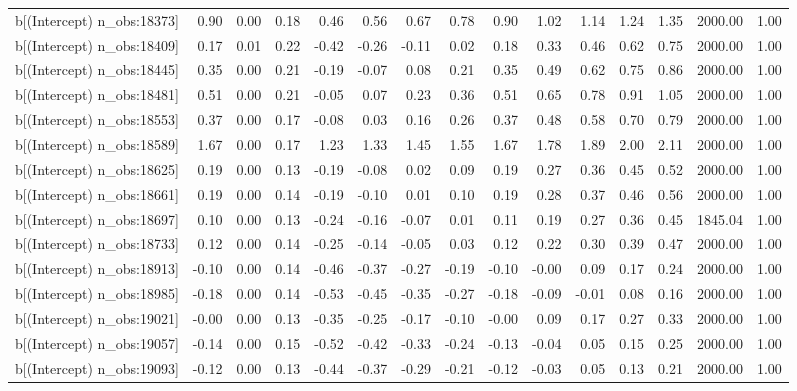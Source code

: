 \begin{table}[ht]
\begin{tabular}{rrrrrrrrrrrrrrr}
  b[(Intercept) n\_obs:18373] & 0.90 & 0.00 & 0.18 & 0.46 & 0.56 & 0.67 & 0.78 & 0.90 & 1.02 & 1.14 & 1.24 & 1.35 & 2000.00 & 1.00 \\ 
  b[(Intercept) n\_obs:18409] & 0.17 & 0.01 & 0.22 & -0.42 & -0.26 & -0.11 & 0.02 & 0.18 & 0.33 & 0.46 & 0.62 & 0.75 & 2000.00 & 1.00 \\ 
  b[(Intercept) n\_obs:18445] & 0.35 & 0.00 & 0.21 & -0.19 & -0.07 & 0.08 & 0.21 & 0.35 & 0.49 & 0.62 & 0.75 & 0.86 & 2000.00 & 1.00 \\ 
  b[(Intercept) n\_obs:18481] & 0.51 & 0.00 & 0.21 & -0.05 & 0.07 & 0.23 & 0.36 & 0.51 & 0.65 & 0.78 & 0.91 & 1.05 & 2000.00 & 1.00 \\ 
  b[(Intercept) n\_obs:18553] & 0.37 & 0.00 & 0.17 & -0.08 & 0.03 & 0.16 & 0.26 & 0.37 & 0.48 & 0.58 & 0.70 & 0.79 & 2000.00 & 1.00 \\ 
  b[(Intercept) n\_obs:18589] & 1.67 & 0.00 & 0.17 & 1.23 & 1.33 & 1.45 & 1.55 & 1.67 & 1.78 & 1.89 & 2.00 & 2.11 & 2000.00 & 1.00 \\ 
  b[(Intercept) n\_obs:18625] & 0.19 & 0.00 & 0.13 & -0.19 & -0.08 & 0.02 & 0.09 & 0.19 & 0.27 & 0.36 & 0.45 & 0.52 & 2000.00 & 1.00 \\ 
  b[(Intercept) n\_obs:18661] & 0.19 & 0.00 & 0.14 & -0.19 & -0.10 & 0.01 & 0.10 & 0.19 & 0.28 & 0.37 & 0.46 & 0.56 & 2000.00 & 1.00 \\ 
  b[(Intercept) n\_obs:18697] & 0.10 & 0.00 & 0.13 & -0.24 & -0.16 & -0.07 & 0.01 & 0.11 & 0.19 & 0.27 & 0.36 & 0.45 & 1845.04 & 1.00 \\ 
  b[(Intercept) n\_obs:18733] & 0.12 & 0.00 & 0.14 & -0.25 & -0.14 & -0.05 & 0.03 & 0.12 & 0.22 & 0.30 & 0.39 & 0.47 & 2000.00 & 1.00 \\ 
  b[(Intercept) n\_obs:18913] & -0.10 & 0.00 & 0.14 & -0.46 & -0.37 & -0.27 & -0.19 & -0.10 & -0.00 & 0.09 & 0.17 & 0.24 & 2000.00 & 1.00 \\ 
  b[(Intercept) n\_obs:18985] & -0.18 & 0.00 & 0.14 & -0.53 & -0.45 & -0.35 & -0.27 & -0.18 & -0.09 & -0.01 & 0.08 & 0.16 & 2000.00 & 1.00 \\ 
  b[(Intercept) n\_obs:19021] & -0.00 & 0.00 & 0.13 & -0.35 & -0.25 & -0.17 & -0.10 & -0.00 & 0.09 & 0.17 & 0.27 & 0.33 & 2000.00 & 1.00 \\ 
  b[(Intercept) n\_obs:19057] & -0.14 & 0.00 & 0.15 & -0.52 & -0.42 & -0.33 & -0.24 & -0.13 & -0.04 & 0.05 & 0.15 & 0.25 & 2000.00 & 1.00 \\ 
  b[(Intercept) n\_obs:19093] & -0.12 & 0.00 & 0.13 & -0.44 & -0.37 & -0.29 & -0.21 & -0.12 & -0.03 & 0.05 & 0.13 & 0.21 & 2000.00 & 1.00 \\ 

\end{tabular}
\end{table}

